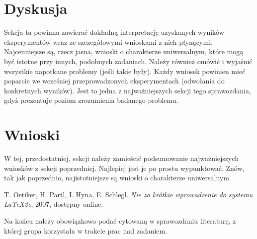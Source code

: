 \documentclass{classrep.cls}
\begin{document}
    \section{Dyskusja}
    {\color{blue}
    Sekcja ta powinna zawierać dokładną interpretację uzyskanych wyników
    eksperymentów wraz ze szczegółowymi wnioskami z nich płynącymi. Najcenniejsze
    są, rzecz jasna, wnioski o charakterze uniwersalnym, które mogą być istotne
    przy innych, podobnych zadaniach. Należy również omówić i wyjaśnić wszystkie
    napotkane problemy (jeśli takie były). Każdy wniosek powinien mieć poparcie we
    wcześniej przeprowadzonych eksperymentach (odwołania do konkretnych wyników).
    Jest to jedna z najważniejszych sekcji tego sprawozdania, gdyż prezentuje
    poziom zrozumienia badanego problemu.}

    \section{Wnioski}
    {\color{blue}
    W tej, przedostatniej, sekcji należy zamieścić podsumowanie najważniejszych
    wniosków z sekcji poprzedniej. Najlepiej jest je po prostu wypunktować. Znów,
        tak jak poprzednio, najistotniejsze są wnioski o charakterze uniwersalnym.}

    \begin{thebibliography}{0}
         T. Oetiker, H. Partl, I. Hyna, E. Schlegl.
        \textsl{Nie za krótkie wprowadzenie do systemu \LaTeX2e}, 2007, dost\k epny
        online.
    \end{thebibliography}

    {\color{blue}
    Na końcu należy obowiązkowo podać cytowaną w sprawozdaniu literaturę, z której
    grupa korzystała w trakcie prac nad zadaniem.}
\end{document}
